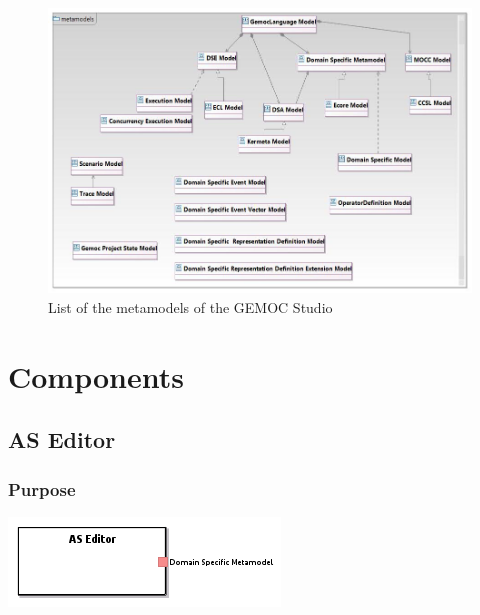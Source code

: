 \documentclass{gemoc} %
\begin{document}
\begin{figure}[htp]
	\begin{center}
	\includegraphics*[trim=0.0cm 0.0cm 0cm 0.0cm, clip=true, width=1.0\linewidth]{../images/Gemoc Metamodels Class Diagram.jpg}
	\caption{List of the metamodels of the GEMOC Studio}
	\label{fig:MetamodelList}
	\end{center}
\end{figure}


\section{Components}


\subsection{AS Editor}
\label{sec:AS_Editor}


\subsubsection{Purpose}


\begin{center}
\includegraphics*[trim=0.0cm 0.0cm 0cm 0.0cm, clip=true]{../images/generated/Generated_AS_Editor.png}
\end{center}
\end{document}
